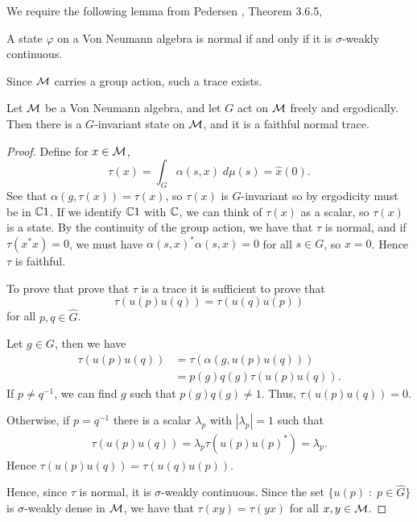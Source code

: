 We require the following lemma from Pedersen \cite{Pedersen1979},
Theorem 3.6.5,
\begin{lemma}
    A state $\varphi$ on a Von Neumann algebra is normal if and only if it is
    $\sigma$-weakly continuous.
\end{lemma}


Since $\mathcal{M}$ carries a group action, such a trace exists.
\begin{lemma}
    Let $\mathcal{M}$ be a Von Neumann algebra, and let $G$ act on $\mathcal{M}$ freely and ergodically.
    Then there is a $G$-invariant state on $\mathcal{M}$, and it is a faithful normal
    trace.
\end{lemma}
\begin{proof}
    Define for $x \in \mathcal{M}$, 
    \begin{equation}
        \tau(x) = \int_G \alpha(s,x)\;d\mu(s) = \hat{x}(0).
    \end{equation}
    See that $\alpha(g,\tau(x)) = \tau(x)$, so $\tau(x)$
    is $G$-invariant so by ergodicity must be in $\mathbb{C} 1$. If we identify
    $\mathbb{C} 1$ with $\mathbb{C}$, we can think of $\tau(x)$ as a scalar, so $\tau(x)$
    is a state. By the continuity of the group action, we have that $\tau$ is normal,
    and if $\tau(x^*x) = 0$, we must have $\alpha(s,x)^*\alpha(s,x) = 0$
    for all $s \in G$, so $x = 0$. Hence $\tau$ is faithful.
    
    To prove that prove that $\tau$ is a trace it is sufficient to prove that
    \begin{equation}
        \tau(u(p)u(q)) = \tau(u(q)u(p))
    \end{equation}
    for all $p,q \in \widehat{G}$. 
    
    Let $g \in G$, then we have
    \begin{align}
        \tau(u(p)u(q)) &= \tau(\alpha(g,u(p)u(q)))\\
        &= p(g)q(g)\tau(u(p)u(q)).
    \end{align}
    If $p \neq q^{-1}$, we can find $g$ such that $p(g)q(g) \neq 1$. Thus,
    $\tau(u(p)u(q)) = 0$.
    
    Otherwise, if $p = q^{-1}$ there is a scalar $\lambda_p$
    with $|\lambda_p| = 1$ such that
    \begin{align}
        \tau(u(p)u(q)) = \lambda_p\tau(u(p)u(p)^*) = \lambda_p.
    \end{align}
    Hence $\tau(u(p)u(q)) = \tau(u(q)u(p))$.
    
    Hence, since $\tau$ is normal, it is $\sigma$-weakly continuous.
    Since the set $\{u(p)\;:\;p \in \widehat{G}\}$ is $\sigma$-weakly
    dense in $\mathcal{M}$, we have that $\tau(xy) = \tau(yx)$ for all $x,y \in \mathcal{M}$.
    
\end{proof} 


